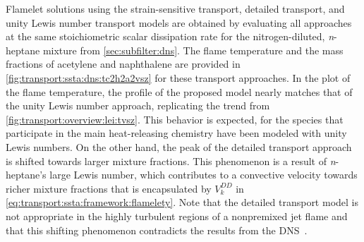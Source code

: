 
Flamelet solutions using the strain-sensitive transport, detailed transport, and unity Lewis number transport models are obtained by evaluating all approaches at the same stoichiometric scalar dissipation rate for the nitrogen-diluted, \textit{n}-heptane mixture from \cref{sec:subfilter:dns}. The flame temperature and the mass fractions of acetylene and naphthalene are provided in \cref{fig:transport:ssta:dns:tc2h2a2vsz} for these transport approaches. In the plot of the flame temperature, the profile of the proposed model nearly matches that of the unity Lewis number approach, replicating the trend from \cref{fig:transport:overview:lei:tvsz}. This behavior is expected, for the species that participate in the main heat-releasing chemistry have been modeled with unity Lewis numbers. On the other hand, the peak of the detailed transport approach is shifted towards larger mixture fractions. This phenomenon is a result of \textit{n}-heptane's large Lewis number, which contributes to a convective velocity towards richer mixture fractions that is encapsulated by $V_k^{DD}$ in \cref{eq:transport:ssta:framework:flamelety}. Note that the detailed transport model is not appropriate in the highly turbulent regions of a nonpremixed jet flame and that this shifting phenomenon contradicts the results from the DNS~\cite{attili2016}.

